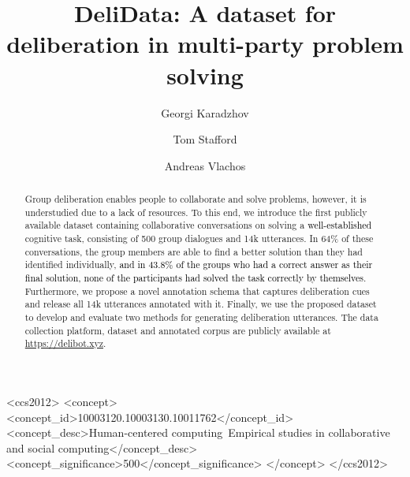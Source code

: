 \documentclass[acmsmall,manuscript,screen]{acmart}
\newcommand\newtext[1]{\textcolor{black}{#1}}
\begin{document}
\title{DeliData: A dataset for deliberation in multi-party problem solving}

\author{Georgi Karadzhov}

\author{Tom Stafford}

\author{Andreas Vlachos}


















\begin{abstract}
 Group deliberation enables people to collaborate and solve problems, however, it is understudied due to a lack of resources.
To this end, we introduce the first publicly available dataset containing collaborative conversations on solving a \newtext{well-established} cognitive task, consisting of 500 group dialogues and 14k utterances. In 64\% of these conversations, the group members are able to find a better solution than they had identified individually, \newtext{and in 43.8\% of the groups who had a correct answer as their final solution, none of the participants had solved the task correctly by themselves}. Furthermore, we propose a novel annotation schema that captures deliberation cues and release all 14k utterances annotated with it. 
Finally, we use the proposed dataset to develop and evaluate two methods for generating deliberation utterances. 
The data collection platform, dataset and annotated corpus are publicly available at \url{https://delibot.xyz}.
\end{abstract}

\begin{CCSXML}
<ccs2012>
<concept>
<concept_id>10003120.10003130.10011762</concept_id>
<concept_desc>Human-centered computing~Empirical studies in collaborative and social computing</concept_desc>
<concept_significance>500</concept_significance>
</concept>
</ccs2012>
\end{CCSXML}

\end{document}
